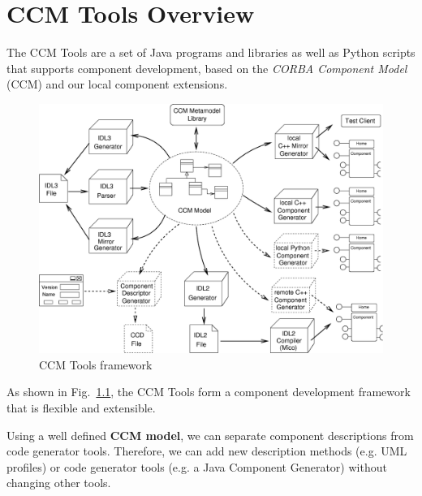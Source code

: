 
\chapter{CCM Tools Overview}

The CCM Tools are a set of Java programs and libraries as well as Python scripts
that supports component development, based on the {\it CORBA Component
Model} (CCM) \cite{CCMSpecification} and our local component extensions. 

\begin{figure}[htbp]
    \begin{center}
        \includegraphics [width=12cm,angle=0] {ComponentGeneratorTools}
        \caption{CCM Tools framework}
        \label{ccmtools}
    \end{center}
\end{figure}

As shown in Fig.~\ref{ccmtools}, the CCM Tools form a component development framework 
that is flexible and extensible.


\newpage
Using a well defined {\bf CCM model}, we can separate component descriptions from
code generator tools. Therefore, we can add new description methods (e.g.
UML profiles) or code generator tools (e.g. a Java Component Generator) without changing
other tools.

